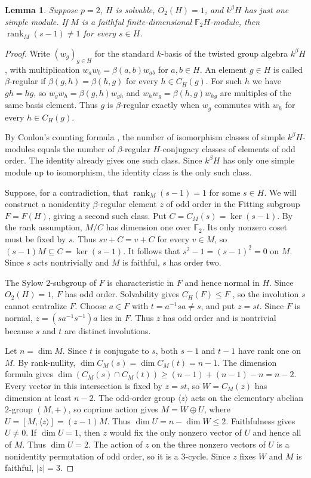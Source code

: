 \documentclass[11pt,a4paper]{article}
\newtheorem{lemma}[theorem]{Lemma}
\theoremstyle{definition}
\theoremstyle{remark}
\numberwithin{equation}{section}
\DeclareMathOperator{\rank}{rank}
\begin{document}
	\begin{lemma}\label{lem:no-transvection}
		Suppose $p=2$, $H$ is solvable, $O_2(H)=1$, and $k^\beta H$ has
		just one simple module. If $M$ is a faithful finite-dimensional
		$\mathbb F_2H$-module, then $\rank_M(s-1)\ne1$ for every $s\in H$.
	\end{lemma}
	
	\begin{proof}
		Write $(w_g)_{g\in H}$ for the standard $k$-basis of the twisted group
		algebra $k^\beta H$, with multiplication $w_a w_b=\beta(a,b)w_{ab}$ for
		$a,b\in H$. An element $g\in H$ is called $\beta$-regular if
		$\beta(g,h)=\beta(h,g)$ for every $h\in C_H(g)$. For such $h$ we have
		$gh=hg$, so $w_g w_h=\beta(g,h)w_{gh}$ and $w_h w_g=\beta(h,g)w_{hg}$
		are multiples of the same basis element. Thus $g$ is $\beta$-regular
		exactly when $w_g$ commutes with $w_h$ for every $h\in C_H(g)$.
		
		By Conlon's counting formula \cite[p.~156]{Conlon1964}, the number
		of isomorphism classes of simple $k^\beta H$-modules equals the number
		of $\beta$-regular $H$-conjugacy classes of elements of odd order.
		The identity already gives one such class. Since $k^\beta H$ has only
		one simple module up to isomorphism, the identity class is the only such class.
		
		Suppose, for a contradiction, that $\rank_M(s-1)=1$ for some $s\in H$.
		We will construct a nonidentity $\beta$-regular element $z$ of odd order
		in the Fitting subgroup $F=F(H)$, giving a second such class.
		Put $C=C_M(s)=\ker(s-1)$. By the rank assumption, $M/C$ has dimension
		one over $\mathbb F_2$. Its only nonzero coset must be fixed by $s$.
		Thus $sv+C=v+C$ for every $v\in M$, so $(s-1)M\subseteq C=\ker(s-1)$.
		It follows that $s^2-1=(s-1)^2=0$ on $M$. Since $s$ acts
		nontrivially and $M$ is faithful, $s$ has order two.
		
		The Sylow $2$-subgroup of $F$ is characteristic in $F$ and hence
		normal in $H$. Since $O_2(H)=1$, $F$ has odd order. Solvability gives
		$C_H(F)\le F$ \cite[Theorem~9.8]{Isaacs2008}, so the involution $s$ cannot centralize $F$.
		Choose $a\in F$ with $t=a^{-1}sa\ne s$, and put $z=st$.
		Since $F$ is normal, $z=(sa^{-1}s^{-1})a$ lies in $F$. Thus $z$ has
		odd order and is nontrivial because $s$ and $t$ are distinct involutions.
		
		Let $n=\dim M$. Since $t$ is conjugate to $s$, both $s-1$ and $t-1$
		have rank one on $M$. By rank-nullity, $\dim C_M(s)=\dim C_M(t)=n-1$.
		The dimension formula gives
		$\dim(C_M(s)\cap C_M(t))\ge (n-1)+(n-1)-n=n-2$.
		Every vector in this intersection is fixed by $z=st$, so
		$W=C_M(z)$ has dimension at least $n-2$. The odd-order group $\langle z\rangle$
		acts on the elementary abelian $2$-group $(M,+)$, so coprime action
		\cite[Theorem~4.34]{Isaacs2008} gives $M=W\oplus U$, where
		$U=[M,\langle z\rangle]=(z-1)M$. Thus $\dim U=n-\dim W\le 2$. Faithfulness gives
		$U\ne0$. If $\dim U=1$, then $z$ would fix the only nonzero vector
		of $U$ and hence all of $M$. Thus $\dim U=2$. The action of $z$ on the three
		nonzero vectors of $U$ is a nonidentity permutation of odd order,
		so it is a $3$-cycle. Since $z$ fixes $W$ and $M$ is faithful, $|z|=3$.
		

\end{proof}
\end{document}
